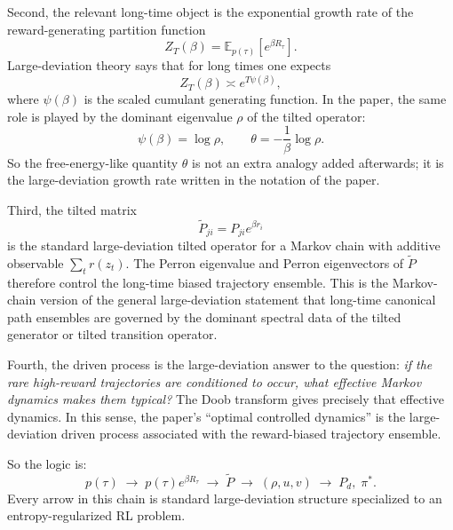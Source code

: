 \documentclass[11pt]{article}
\begin{document}
Second, the relevant long-time object is the exponential growth rate of the reward-generating
partition function
\begin{equation}
    Z_T(\beta)
    =
    \mathbb E_{p(\tau)}\!\left[e^{\beta R_\tau}\right].
\end{equation}
Large-deviation theory says that for long times one expects
\begin{equation}
    Z_T(\beta)\asymp e^{T\psi(\beta)},
\end{equation}
where \(\psi(\beta)\) is the scaled cumulant generating function. In the paper, the same role is
played by the dominant eigenvalue \(\rho\) of the tilted operator:
\begin{equation}
    \psi(\beta)=\log \rho,
    \qquad
    \theta=-\frac{1}{\beta}\log \rho.
\end{equation}
So the free-energy-like quantity \(\theta\) is not an extra analogy added afterwards; it is the
large-deviation growth rate written in the notation of the paper.

Third, the tilted matrix
\begin{equation}
    \widetilde P_{ji}=P_{ji}e^{\beta r_i}
\end{equation}
is the standard large-deviation tilted operator for a Markov chain with additive observable
\(\sum_t r(z_t)\). The Perron eigenvalue and Perron eigenvectors of \(\widetilde P\) therefore
control the long-time biased trajectory ensemble. This is the Markov-chain version of the
general large-deviation statement that long-time canonical path ensembles are governed by the
dominant spectral data of the tilted generator or tilted transition operator.

Fourth, the driven process is the large-deviation answer to the question: \emph{if the rare
high-reward trajectories are conditioned to occur, what effective Markov dynamics makes them
typical?} The Doob transform gives precisely that effective dynamics. In this sense, the paper's
``optimal controlled dynamics'' is the large-deviation driven process associated with the
reward-biased trajectory ensemble.

So the logic is:
\begin{equation}
    p(\tau)
    \;\longrightarrow\;
    p(\tau)e^{\beta R_\tau}
    \;\longrightarrow\;
    \widetilde P
    \;\longrightarrow\;
    (\rho,u,v)
    \;\longrightarrow\;
    P_d,\;\pi^*.
\end{equation}
Every arrow in this chain is standard large-deviation structure specialized to an
entropy-regularized RL problem.
\end{document}
